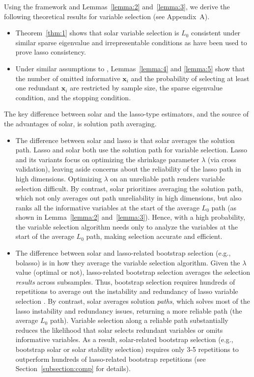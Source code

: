 \documentclass[11pt,review,authoryear]{elsarticle}
\begin{document}
Using the \citet{zhang09} framework and Lemmas~\ref{lemma:2} and~\ref{lemma:3}, we derive the following theoretical results for variable selection (see Appendix~A).

\begin{itemize}
  \item Theorem~\ref{thm:1} shows that solar variable selection is $L_0$ consistent under similar sparse eigenvalue and irrepresentable conditions as have been used to prove  lasso consistency.
  \item Under similar assumptions to \citet{zhang09}, Lemmas~\ref{lemma:4} and \ref{lemma:5} show that the number of omitted informative $\mathbf{x}_i$ and the probability of selecting at least one redundant $\mathbf{x}_i$ are restricted by sample size, the sparse eigenvalue condition, and the stopping condition.
\end{itemize}

The key difference between solar and the lasso-type estimators, and the source of the advantages of solar, is solution path averaging.
%
\begin{itemize}
  \item The difference between solar and lasso is that solar averages the solution path. Lasso and solar both use the solution path for variable selection. Lasso and its variants focus on optimizing the shrinkage parameter $\lambda$ (via cross validation), leaving aside concerns about the reliability of the lasso path in high dimensions. Optimizing $\lambda$ on an unreliable path renders variable selection difficult. By contrast, solar  prioritizes averaging the solution path, which not only averages out  path unreliability in high dimensions, but also ranks all the informative variables at the start of the average $L_0$ path (as shown in Lemma~\ref{lemma:2} and~\ref{lemma:3}). Hence, with a high probability, the variable selection algorithm needs only to analyze the variables at the start of the average $L_0$ path, making selection accurate and efficient.
  \item The difference between solar and lasso-related bootstrap selection (e.g., bolasso) is in how they average the variable selection algorithm. Given the $\lambda$ value (optimal or not), lasso-related bootstrap selection averages the selection \emph{results} across subsamples. Thus, bootstrap selection requires hundreds of repetitions to average out the instability and redundancy of lasso variable selection \citep{bach2008bolasso}. By contrast, solar averages solution \emph{paths}, which solves most of the lasso instability and redundancy issues, returning a more reliable path (the average $L_0$ path). Variable selection along a reliable path substantially reduces the likelihood that solar selects redundant variables or omits informative variables. As a result, solar-related bootstrap selection (e.g., bootstrap solar or solar stability selection) requires only 3-5 repetitions to outperform hundreds of lasso-related bootstrap repetitions (see Section~\ref{subsection:comp} for details).
\end{itemize}
\end{document}
